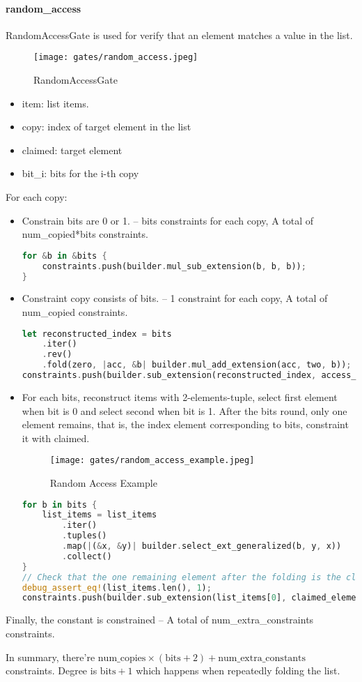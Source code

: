 \paragraph{random\_access}

RandomAccessGate is used for verify that an element matches a value in the list.

\begin{figure}[!ht]
    \centering
    \texttt{[image: gates/random\_access.jpeg]}
    \caption{RandomAccessGate}
    \label{fig:random-access}
\end{figure}

\begin{itemize}
    \item item: list items.
    \item copy: index of target element in the list
    \item claimed: target element
    \item bit\_i: bits for the i-th copy
\end{itemize}

For each copy:
\begin{itemize}
    \item Constrain bits are 0 or 1. -- bits constraints for each copy, A total of num\_copied*bits constraints.
    \begin{lstlisting}[language=rust]
for &b in &bits {
    constraints.push(builder.mul_sub_extension(b, b, b));
}
    \end{lstlisting}
    \item Constraint copy consists of bits. -- 1 constraint for each copy, A total of num\_copied constraints.
    \begin{lstlisting}[language=rust]
let reconstructed_index = bits
    .iter()
    .rev()
    .fold(zero, |acc, &b| builder.mul_add_extension(acc, two, b));
constraints.push(builder.sub_extension(reconstructed_index, access_index));
    \end{lstlisting}
    \item For each bits, reconstruct items with 2-elements-tuple, select first element when bit is 0 and select second when bit is 1.
    After the bits round, only one element remains, that is, the index element corresponding to bits, constraint it with claimed.
    \begin{figure}[!ht]
        \centering
        \texttt{[image: gates/random\_access\_example.jpeg]}
        \caption{Random Access Example}
        \label{fig:random-access-example}
    \end{figure}
    \begin{lstlisting}[language=rust]
for b in bits {
    list_items = list_items
        .iter()
        .tuples()
        .map(|(&x, &y)| builder.select_ext_generalized(b, y, x))
        .collect()
}
// Check that the one remaining element after the folding is the claimed element.
debug_assert_eq!(list_items.len(), 1);
constraints.push(builder.sub_extension(list_items[0], claimed_element));
    \end{lstlisting}
\end{itemize}

Finally, the constant is constrained -- A total of num\_extra\_constraints constraints.

In summary, there're $\text{num\_copies} \times (\text{bits} + 2) + \text{num\_extra\_constants}$ constraints. Degree is $\text{bits} + 1$ which happens when repeatedly folding the list. 
